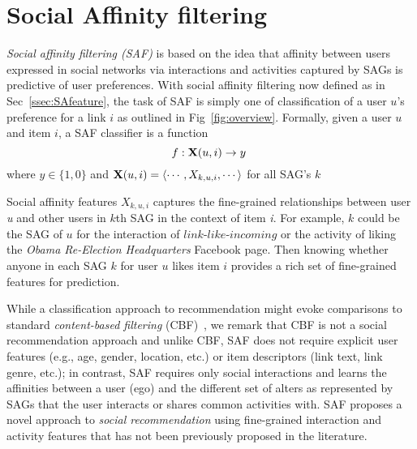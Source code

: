 
\section{Social Affinity filtering}

\emph{Social affinity filtering (SAF)} is based on the idea that
affinity between users expressed in social networks via interactions
and activities captured by SAGs is predictive of user preferences.
With social affinity filtering now defined as in Sec~\ref{ssec:SAfeature}, the task of SAF is
simply one of classification of a user $u$'s preference for a link $i$
as outlined in Fig~\ref{fig:overview}. 
Formally, given a user $u$ and item $i$, a SAF classifier is  a
function 
$$f: \x(u,i) \to y\ $$ where $ y \in \{1, 0\}$ and $\x(u,i) = \langle
\cdots,X_{k,u,i},\cdots \rangle$ for all SAG's $k$

Social affinity features $X_{k,u,i}$ captures the fine-grained relationships between user \textit{u}
and other users in $k$th SAG in the context of item \textit{i}.
For example, $k$ could be the SAG of $u$ for the interaction of $\textit{link-like-incoming}$ or the activity of
liking the {\em Obama Re-Election Headquarters} Facebook page.  Then knowing whether
anyone in each SAG $k$ for user $u$ likes item $i$ provides a rich set
of fine-grained features for prediction.

While a classification approach to recommendation might evoke comparisons to standard
\emph{content-based filtering} (CBF)~\cite{newsweeder}, we remark that
CBF is not a social recommendation approach and unlike CBF, SAF does
not require explicit user features (e.g., age, gender, location, etc.)
or item descriptors (link text, link genre, etc.); in contrast, SAF
requires only social interactions and learns the affinities between a
user (ego) and the different set of alters as represented by SAGs that
the user interacts or shares common activities with. SAF proposes a novel 
approach to \emph{social recommendation} using fine-grained interaction and
activity features that has not been previously proposed in the literature.
 


